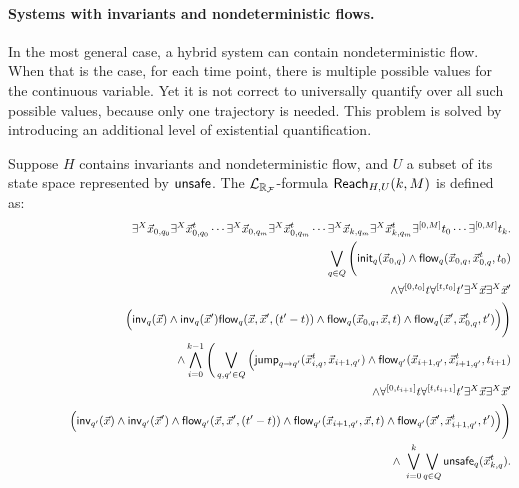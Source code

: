 \documentclass[12pt]{article}
\begin{document}
\paragraph{Systems with invariants and nondeterministic flows.} In the most general case, a hybrid system can contain nondeterministic flow. When that is the case, for each time point, there is multiple possible values for the continuous variable. Yet it is not correct to universally quantify over all such possible values, because only one trajectory is needed. This problem is solved by introducing an additional level of existential quantification.
\begin{definition}
Suppose $H$ contains invariants and nondeterministic flow, and $U$ a subset of its state space represented by $\mathsf{unsafe}$. The $\mathcal{L}_{\mathbb{R}_{\mathcal{F}}}$-formula $\mathsf{Reach}_{H,U}(k,M)$ is defined as:
\begin{eqnarray*}
& &\exists^X \vec x_{0,q_0} \exists^X\vec x_{0,q_0}^t\cdots \exists^X\vec
x_{0,q_m}\exists^X \vec x_{0,q_m}^t\cdots\exists^X \vec x_{k,q_m}\exists^X\vec x_{k,q_m}^t\exists^{[0,M]}t_0\cdots \exists^{[0,M]}t_k.\\
& &\bigvee_{q\in Q} \Bigg(\mathsf{init}_{q}(\vec x_{0,q})\wedge \mathsf{flow}_{q}(\vec x_{0,q}, \vec x_{0,q}^t, t_0) \\
& &\hspace{1.5cm}
\wedge\forall^{[0,t_0]}t\forall^{[t,t_0]}t' \exists^X\vec x\exists^X\vec x'\\
& &\hspace{1.5cm}\Big(\mathsf{inv}_{q}(\vec x)\wedge \mathsf{inv}_{q}(\vec x')\mathsf{flow}_{q}(\vec x, \vec x',(t'-t))\wedge \mathsf{flow}_{q}(\vec x_{0, q}, \vec x, t)\wedge \mathsf{flow}_{q}(\vec x', \vec x^t_{0,q}, t')\Big)\Bigg) \\
& &\wedge
\bigwedge_{i=0}^{k-1}\Bigg( \bigvee_{q, q'\in Q} \Big(\mathsf{jump}_{q\rightarrow q'}(\vec
x_{i,q}^t, \vec x_{i+1,q'})\wedge \mathsf{flow}_{q'}(\vec x_{i+1,q'}, \vec x_{i+1,q'}^t, t_{i+1})\\
& &\hspace{1.5cm}
\wedge \forall^{[0,t_{i+1}]}t\forall^{[t,t_{i+1}]}t'\exists^X\vec  x\exists^X \vec  x'\\
& &\hspace{1.5cm}\Big(\mathsf{inv}_{q'}(\vec x)\wedge \mathsf{inv}_{q'}(\vec x')\wedge\mathsf{flow}_{q'}(\vec x, \vec x', (t'-t))\wedge \mathsf{flow}_{q'}(\vec x_{i+1, q'}, \vec x, t)\wedge \mathsf{flow}_{q'}(\vec x', \vec x^t_{i+1,q'}, t')\Big)\Bigg)\\
& &\wedge\ \bigvee_{i=0}^k\bigvee_{q\in Q} \mathsf{unsafe}_q(\vec x_{k,q}^t).
\end{eqnarray*}
\end{definition}
\end{document}
